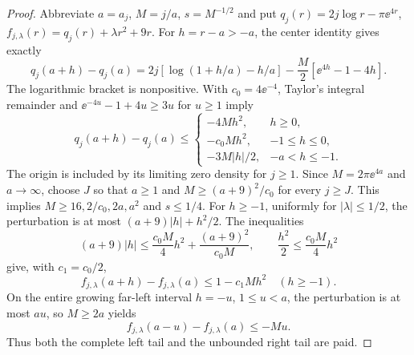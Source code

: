 \begin{proof}
Abbreviate $a=a_j$, $M=j/a$, $s=M^{-1/2}$ and put
$q_j(r)=2j\log r-\pi\ee^{4r}$,
$f_{j,\lambda}(r)=q_j(r)+\lambda r^2+9r$. For $h=r-a>-a$, the center
identity gives exactly
\begin{equation}\label{eq:hcexponent}
 q_j(a+h)-q_j(a)
 =2j[\log(1+h/a)-h/a]-\frac M2[\ee^{4h}-1-4h].
\end{equation}
The logarithmic bracket is nonpositive. With $c_0=4\ee^{-4}$, Taylor's
integral remainder and $\ee^{-4u}-1+4u\ge3u$ for $u\ge1$ imply
\begin{equation}\label{eq:hcthreeparts}
 q_j(a+h)-q_j(a)\le
 \begin{cases}
 -4Mh^2,&h\ge0,\\
 -c_0Mh^2,&-1\le h\le0,\\
 -3M|h|/2,&-a<h\le-1.
 \end{cases}
\end{equation}
The origin is included by its limiting zero density for $j\ge1$.
Since $M=2\pi\ee^{4a}$ and $a\to\infty$, choose $J$ so that
$a\ge1$ and $M\ge(a+9)^2/c_0$ for every $j\ge J$.
This implies $M\ge16,2/c_0,2a,a^2$ and $s\le1/4$.
For $h\ge-1$, uniformly for $|\lambda|\le1/2$, the perturbation is at
most $(a+9)|h|+h^2/2$. The inequalities
\[
 (a+9)|h|\le\frac{c_0M}{4}h^2+\frac{(a+9)^2}{c_0M},\qquad
 \frac{h^2}{2}\le\frac{c_0M}{4}h^2
\]
give, with $c_1=c_0/2$,
\begin{equation}\label{eq:hcglobalupper}
 f_{j,\lambda}(a+h)-f_{j,\lambda}(a)\le1-c_1Mh^2
 \quad(h\ge-1).
\end{equation}
On the entire growing far-left interval $h=-u$, $1\le u<a$, the
perturbation is at most $au$, so $M\ge2a$ yields
\begin{equation}\label{eq:hcleft}
 f_{j,\lambda}(a-u)-f_{j,\lambda}(a)\le-Mu.
\end{equation}
Thus both the complete left tail and the unbounded right tail are paid.


\end{proof}
